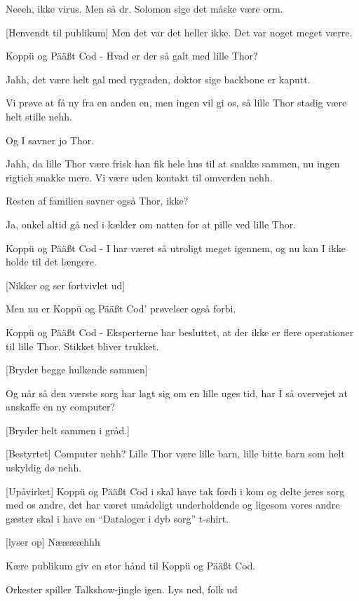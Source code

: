 \documentclass[a4paper]{article}
\begin{document}
\begin{sketch}
 Neeeh, ikke virus. Men så dr. Solomon sige det måske være orm.

[Henvendt til publikum] Men det var det heller ikke. Det var
noget meget værre.

 Koppü og Pää\ss t Cod - Hvad er der så galt med lille Thor?

 Jahh, det være helt gal med rygraden, doktor sige backbone
er kaputt.

Vi prøve at få ny fra en anden en, men ingen vil gi os, så lille Thor
stadig være helt stille nehh.

 Og I savner jo Thor.

 Jahh, da lille Thor være frisk han fik hele hus til at
snakke sammen, nu ingen rigtich snakke mere. Vi være uden kontakt til
omverden nehh.

 Resten af familien savner også Thor, ikke?

 Ja, onkel altid gå ned i kælder om natten for at pille ved lille
Thor.

 Koppü og Pää\ss t Cod - I har været så utroligt meget
igennem, og nu kan I ikke holde til det længere.

[Nikker og ser fortvivlet ud]

 Men nu er Koppü og Pää\ss t Cod' prøvelser også forbi.

 Koppü og Pää\ss t Cod - Eksperterne har besluttet, at der
ikke er flere operationer til lille Thor. Stikket bliver trukket.

[Bryder begge hulkende sammen]

 Og når så den værste sorg har lagt sig om en lille uges tid,
har I så overvejet at anskaffe en ny computer?

[Bryder helt sammen i gråd.]

[Bestyrtet] Computer nehh? Lille Thor være lille barn, lille bitte
barn som helt uskyldig dø nehh.

[Upåvirket] Koppü og Pää\ss t Cod i skal have tak fordi i kom
og delte jeres sorg med os andre, det har været umådeligt
underholdende og ligesom vores andre gæster skal i have en ``Dataloger
i dyb sorg'' t-shirt.

[lyser op] Nææææhhh 

 Kære publikum giv en stor hånd til Koppü og Pää\ss t Cod.

\scene Orkester spiller Talkshow-jingle igen. Lys ned, folk ud

\end{sketch}
\end{document}
